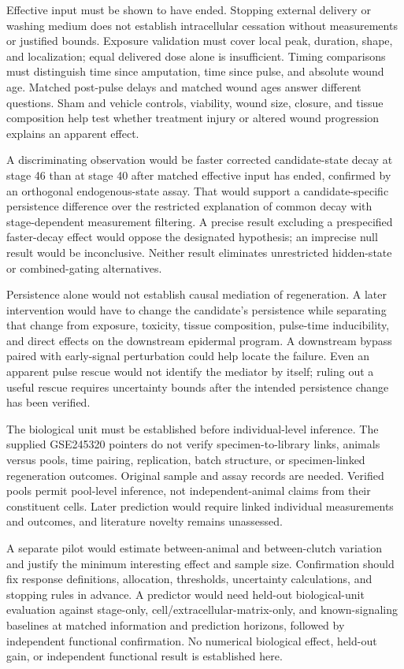 \documentclass[11pt]{article}
\begin{document}
Effective input must be shown to have ended. Stopping external delivery or washing medium does not establish intracellular cessation without measurements or justified bounds. Exposure validation must cover local peak, duration, shape, and localization; equal delivered dose alone is insufficient. Timing comparisons must distinguish time since amputation, time since pulse, and absolute wound age. Matched post-pulse delays and matched wound ages answer different questions. Sham and vehicle controls, viability, wound size, closure, and tissue composition help test whether treatment injury or altered wound progression explains an apparent effect.

A discriminating observation would be faster corrected candidate-state decay at stage 46 than at stage 40 after matched effective input has ended, confirmed by an orthogonal endogenous-state assay. That would support a candidate-specific persistence difference over the restricted explanation of common decay with stage-dependent measurement filtering. A precise result excluding a prespecified faster-decay effect would oppose the designated hypothesis; an imprecise null result would be inconclusive. Neither result eliminates unrestricted hidden-state or combined-gating alternatives.

Persistence alone would not establish causal mediation of regeneration. A later intervention would have to change the candidate's persistence while separating that change from exposure, toxicity, tissue composition, pulse-time inducibility, and direct effects on the downstream epidermal program. A downstream bypass paired with early-signal perturbation could help locate the failure. Even an apparent pulse rescue would not identify the mediator by itself; ruling out a useful rescue requires uncertainty bounds after the intended persistence change has been verified.

The biological unit must be established before individual-level inference. The supplied GSE245320 pointers do not verify specimen-to-library links, animals versus pools, time pairing, replication, batch structure, or specimen-linked regeneration outcomes. Original sample and assay records are needed. Verified pools permit pool-level inference, not independent-animal claims from their constituent cells. Later prediction would require linked individual measurements and outcomes, and literature novelty remains unassessed.

A separate pilot would estimate between-animal and between-clutch variation and justify the minimum interesting effect and sample size. Confirmation should fix response definitions, allocation, thresholds, uncertainty calculations, and stopping rules in advance. A predictor would need held-out biological-unit evaluation against stage-only, cell/extracellular-matrix-only, and known-signaling baselines at matched information and prediction horizons, followed by independent functional confirmation. No numerical biological effect, held-out gain, or independent functional result is established here.
\end{document}
